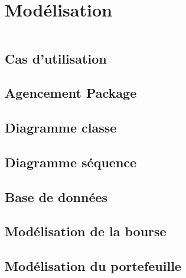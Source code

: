 \documentclass{beamer}
\begin{document}
	        
	 \section{Modélisation}
        \begin{frame}
            \begin{columns}[t]
  				\begin{column}{5cm}
  					\tableofcontents[sections={1-4}, currentsection, hideothersubsections]
  				\end{column}
  				\begin{column}{5cm}
  				\tableofcontents[sections={5-9}, currentsection, hideothersubsections]
  				\end{column}
  			\end{columns}
        \end{frame}
        \subsection{Cas d'utilisation}
	        
        \subsection{Agencement Package}
	        
	    \subsection{Diagramme classe}
	            
		\subsection{Diagramme séquence}
	        
	    \subsection{Base de données}
	        
	    \subsection{Modélisation de la bourse}
	        
	    \subsection{Modélisation du portefeuille}
	                            	   
    
\end{document}
